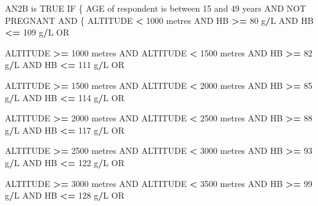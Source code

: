 \documentclass[12pt,a4paper]{article}
\newenvironment{Shaded}{\begin{snugshade}}{\end{snugshade}}
\newcommand{\DecValTok}[1]{\textcolor[rgb]{0.00,0.00,0.81}{#1}}
\newcommand{\NormalTok}[1]{#1}
\newcommand{\OperatorTok}[1]{\textcolor[rgb]{0.81,0.36,0.00}{\textbf{#1}}}
\newcommand{\OtherTok}[1]{\textcolor[rgb]{0.56,0.35,0.01}{#1}}
\newcommand{\StringTok}[1]{\textcolor[rgb]{0.31,0.60,0.02}{#1}}
\begin{document}
\begin{Shaded}
\begin{Highlighting}[]
\NormalTok{AN2B is }\OtherTok{TRUE}\NormalTok{ IF}
\NormalTok{  \{}
\NormalTok{    AGE of respondent is between }\DecValTok{15}\NormalTok{ and }\DecValTok{49}\NormalTok{ years AND NOT PREGNANT AND}
\NormalTok{      \{}
\NormalTok{        ALTITUDE }\OperatorTok{<}\StringTok{ }\DecValTok{1000}\NormalTok{ metres AND HB }\OperatorTok{>=}\StringTok{ }\DecValTok{80}\NormalTok{ g}\OperatorTok{/}\NormalTok{L AND HB }\OperatorTok{<=}\StringTok{ }\DecValTok{109}\NormalTok{ g}\OperatorTok{/}\NormalTok{L OR}
     
\NormalTok{        ALTITUDE }\OperatorTok{>=}\StringTok{ }\DecValTok{1000}\NormalTok{ metres AND ALTITUDE }\OperatorTok{<}\StringTok{ }\DecValTok{1500}\NormalTok{ metres AND }
\NormalTok{          HB }\OperatorTok{>=}\StringTok{ }\DecValTok{82}\NormalTok{ g}\OperatorTok{/}\NormalTok{L AND HB }\OperatorTok{<=}\StringTok{ }\DecValTok{111}\NormalTok{ g}\OperatorTok{/}\NormalTok{L OR}
     
\NormalTok{        ALTITUDE }\OperatorTok{>=}\StringTok{ }\DecValTok{1500}\NormalTok{ metres AND ALTITUDE }\OperatorTok{<}\StringTok{ }\DecValTok{2000}\NormalTok{ metres AND }
\NormalTok{          HB }\OperatorTok{>=}\StringTok{ }\DecValTok{85}\NormalTok{ g}\OperatorTok{/}\NormalTok{L AND HB }\OperatorTok{<=}\StringTok{ }\DecValTok{114}\NormalTok{ g}\OperatorTok{/}\NormalTok{L OR}

\NormalTok{        ALTITUDE }\OperatorTok{>=}\StringTok{ }\DecValTok{2000}\NormalTok{ metres AND ALTITUDE }\OperatorTok{<}\StringTok{ }\DecValTok{2500}\NormalTok{ metres AND }
\NormalTok{          HB }\OperatorTok{>=}\StringTok{ }\DecValTok{88}\NormalTok{ g}\OperatorTok{/}\NormalTok{L AND HB }\OperatorTok{<=}\StringTok{ }\DecValTok{117}\NormalTok{ g}\OperatorTok{/}\NormalTok{L OR}

\NormalTok{        ALTITUDE }\OperatorTok{>=}\StringTok{ }\DecValTok{2500}\NormalTok{ metres AND ALTITUDE }\OperatorTok{<}\StringTok{ }\DecValTok{3000}\NormalTok{ metres AND }
\NormalTok{          HB }\OperatorTok{>=}\StringTok{ }\DecValTok{93}\NormalTok{ g}\OperatorTok{/}\NormalTok{L AND HB }\OperatorTok{<=}\StringTok{ }\DecValTok{122}\NormalTok{ g}\OperatorTok{/}\NormalTok{L OR}

\NormalTok{        ALTITUDE }\OperatorTok{>=}\StringTok{ }\DecValTok{3000}\NormalTok{ metres AND ALTITUDE }\OperatorTok{<}\StringTok{ }\DecValTok{3500}\NormalTok{ metres AND }
\NormalTok{          HB }\OperatorTok{>=}\StringTok{ }\DecValTok{99}\NormalTok{ g}\OperatorTok{/}\NormalTok{L AND HB }\OperatorTok{<=}\StringTok{ }\DecValTok{128}\NormalTok{ g}\OperatorTok{/}\NormalTok{L OR}


\end{Highlighting}
\end{Shaded}
\end{document}
